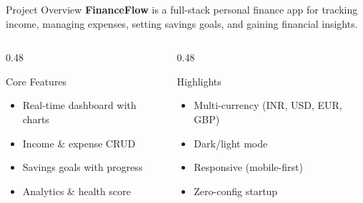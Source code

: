\documentclass[aspectratio=169, 12pt]{beamer}
\begin{document}
\begin{frame}{Project Overview}
\textbf{FinanceFlow} is a full-stack personal finance app for tracking income, managing expenses, setting savings goals, and gaining financial insights.

\vspace{10pt}
\begin{columns}[T]
\begin{column}{0.48\textwidth}
\begin{block}{Core Features}
\begin{itemize}\itemsep=2pt
    \item Real-time dashboard with charts
    \item Income \& expense CRUD
    \item Savings goals with progress
    \item Analytics \& health score
\end{itemize}
\end{block}
\end{column}
\begin{column}{0.48\textwidth}
\begin{block}{Highlights}
\begin{itemize}\itemsep=2pt
    \item Multi-currency (INR, USD, EUR, GBP)
    \item Dark/light mode
    \item Responsive (mobile-first)
    \item Zero-config startup
\end{itemize}
\end{block}
\end{column}
\end{columns}
\end{frame}

\end{document}
